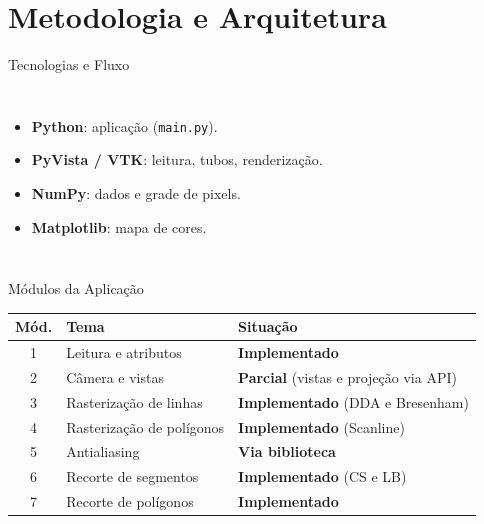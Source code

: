 \documentclass[aspectratio=169,11pt]{beamer}
\newcommand{\status}[1]{\textcolor{ufopred}{\textbf{#1}}}
\begin{document}
\section{Metodologia e Arquitetura}
\begin{frame}{Tecnologias e Fluxo}
\begin{columns}[T,onlytextwidth]
\begin{itemize}
  \item \textbf{Python}: aplicação (\texttt{main.py}).
  \item \textbf{PyVista / VTK}: leitura, tubos, renderização.
  \item \textbf{NumPy}: dados e grade de pixels.
  \item \textbf{Matplotlib}: mapa de cores.
\end{itemize}
\centering
{}
\end{columns}
\end{frame}

\begin{frame}{Módulos da Aplicação}
\small
\begin{tabularx}{\textwidth}{c p{} X}
\toprule
\textbf{Mód.} & \textbf{Tema} & \textbf{Situação}\\
\midrule
1 & Leitura e atributos & \status{Implementado}\\
2 & Câmera e vistas & \status{Parcial} (vistas e projeção via API)\\
3 & Rasterização de linhas & \status{Implementado} (DDA e Bresenham)\\
4 & Rasterização de polígonos & \status{Implementado} (Scanline)\\
5 & Antialiasing & \status{Via biblioteca}\\
6 & Recorte de segmentos & \status{Implementado} (CS e LB)\\
7 & Recorte de polígonos & \status{Implementado}\\
\bottomrule
\end{tabularx}
\end{frame}
\end{document}
